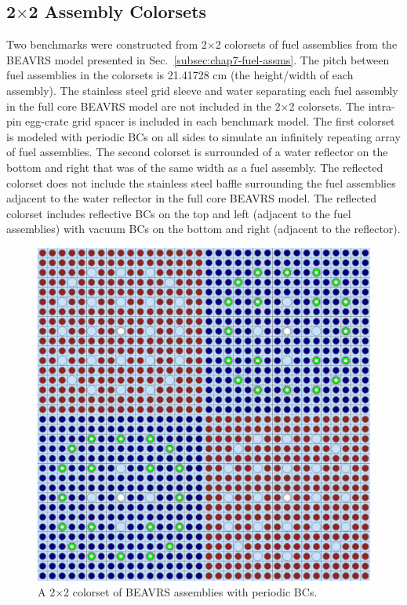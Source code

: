 \subsection{2$\times$2 Assembly Colorsets}
\label{subsec:chap7-2x2-colorsets}

Two benchmarks were constructed from 2$\times$2 colorsets of fuel assemblies from the \ac{BEAVRS} model presented in Sec.~\ref{subsec:chap7-fuel-assms}. The pitch between fuel assemblies in the colorsets is 21.41728 cm (the height/width of each assembly). The stainless steel grid sleeve and water separating each fuel assembly in the full core \ac{BEAVRS} model are not included in the 2$\times$2 colorsets. The intra-pin egg-crate grid spacer is included in each benchmark model. The first colorset is modeled with periodic \acp{BC} on all sides to simulate an infinitely repeating array of fuel assemblies. The second colorset is surrounded of a water reflector on the bottom and right that was of the same width as a fuel assembly. The reflected colorset does not include the stainless steel baffle surrounding the fuel assemblies adjacent to the water reflector in the full core \ac{BEAVRS} model. The reflected colorset includes reflective \acp{BC} on the top and left (adjacent to the fuel assemblies) with vacuum \acp{BC} on the bottom and right (adjacent to the reflector).

\begin{figure}[h!]
  \centering
  \includegraphics[width=0.63\linewidth]{figures/benchmarks/2x2}
\vspace{2mm}
\caption[A 2$\times$2 colorset of BEAVRS assemblies]{A 2$\times$2 colorset of BEAVRS assemblies with periodic \acp{BC}.}
\label{fig:chap7-2x2}
\end{figure}

